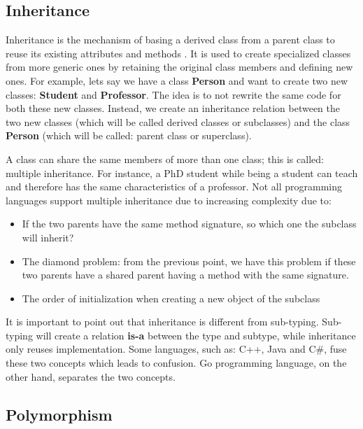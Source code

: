 \documentclass[12pt]{KodeBookAr}
\begin{document}
\subsection{Inheritance}

Inheritance is the mechanism of basing a derived class from a parent class to reuse its existing attributes and methods \citep{2016-techdifferences}. 
It is used to create specialized classes from more generic ones by retaining the original class members and defining new ones. 
For example, lets say we have a class \textbf{Person} and want to create two new classes: \textbf{Student} and \textbf{Professor}. 
The idea is to not rewrite the same code for both these new classes. 
Instead, we create an inheritance relation between the two new classes (which will be called derived classes or subclasses) and the class \textbf{Person} (which will be called: parent class or superclass). 

A class can share the same members of more than one class; this is called: multiple inheritance. 
For instance, a PhD student while being a student can teach and therefore has the same characteristics of a professor. 
Not all programming languages support multiple inheritance due to increasing complexity due to:
\begin{itemize}
	\item If the two parents have the same method signature, so which one the subclass will inherit?
	\item The diamond problem: from the previous point, we have this problem if these two parents have a shared parent having a method with the same signature.
	\item The order of initialization when creating a new object of the subclass 
\end{itemize}

It is important to point out that inheritance is different from sub-typing\citep{1989-cook-al}. 
Sub-typing will create a relation \textbf{is-a} between the type and subtype, while inheritance only reuses implementation.
Some languages, such as: C++, Java and C\#, fuse these two concepts which leads to confusion.
Go programming language, on the other hand, separates the two concepts.  

\subsection{Polymorphism}
\end{document}
